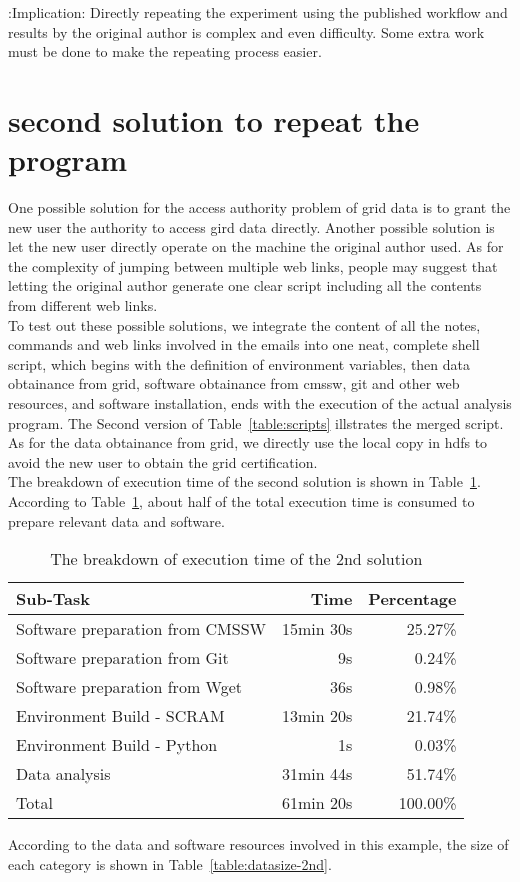 \documentclass{article}
\begin{document}
:Implication:  Directly repeating the experiment using the published workflow and results by the original author is complex and even difficulty. Some extra work must be done to make the repeating process easier.

\section{second solution to repeat the program}
\indent One possible solution for the access authority problem of grid data is to grant the new user the authority to access gird data directly. Another possible solution is let the new user directly operate on the machine the original author used. As for the complexity of jumping between multiple web links, people may suggest that letting the original author generate one clear script including all the contents from different web links.\\

To test out these possible solutions, we integrate the content of all the notes, commands and web links involved in the emails into one neat, complete shell script, which begins with the definition of environment variables, then data obtainance from grid, software obtainance from cmssw, git and other web resources, and software installation, ends with the execution of the actual analysis program. The Second version of Table~\ref{table:scripts} illstrates the merged script. As for the data obtainance from grid, we directly use the local copy in hdfs to avoid the new user to obtain the grid certification.\\

The breakdown of execution time of the second solution is shown in Table~\ref{table:time-2nd}. According to Table~\ref{table:time-2nd}, about half of the total execution time is consumed to prepare relevant data and software.\\

\begin{table}
    \centering
    \begin{tabular}{|l|r|r|}
    \hline
    Sub-Task & Time & Percentage \\ \hline
    Software preparation from CMSSW & 15min 30s & 25.27\% \\ \hline
    Software preparation from Git & 9s & 0.24\% \\ \hline
    Software preparation from Wget & 36s & 0.98\% \\ \hline
    Environment Build - SCRAM & 13min 20s & 21.74\% \\ \hline
    Environment Build - Python & 1s & 0.03\% \\ \hline
    Data analysis & 31min 44s & 51.74\% \\ \hline
    Total & 61min 20s & 100.00\% \\ \hline
    \end{tabular}
    \caption{The breakdown of execution time of the 2nd solution}
    \label{table:time-2nd}
\end{table}
According to the data and software resources involved in this example, the size of each category is shown in Table~\ref{table:datasize-2nd}.\\
\end{document}
